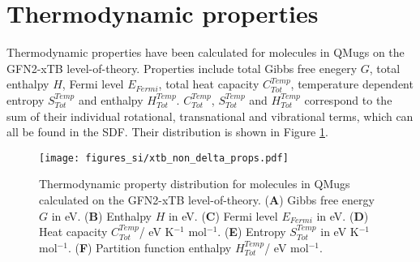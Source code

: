 \newpage
\section{Thermodynamic properties}
Thermodynamic properties have been calculated for molecules in QMugs on the GFN2-xTB level-of-theory. Properties include total Gibbs free enegery $G$, total enthalpy $H$,  Fermi level $E_{Fermi}$, total heat capacity $C_{Tot}^{Temp}$, temperature dependent entropy $S_{Tot}^{Temp}$ and enthalpy $H_{Tot}^{Temp}$. $C_{Tot}^{Temp}$, $S_{Tot}^{Temp}$ and $H_{Tot}^{Temp}$ correspond to the sum of their individual rotational, transnational and vibrational terms, which can all be found in the SDF. Their distribution is shown in Figure \ref{fig:theromo}. 

\begin{figure}[H]
\centering
\texttt{[image: figures\_si/xtb\_non\_delta\_props.pdf]}
\caption{Thermodynamic property distribution for molecules in QMugs calculated on the GFN2-xTB level-of-theory. (\textbf{A}) Gibbs free energy $G$ in eV. (\textbf{B}) Enthalpy $H$ in eV. (\textbf{C}) Fermi level $E_{Fermi}$ in eV. (\textbf{D}) Heat capacity $C_{Tot}^{Temp}$/ eV K$^{-1}$ mol$^{-1}$.  (\textbf{E}) Entropy $S_{Tot}^{Temp}$ in eV K$^{-1}$ mol$^{-1}$. (\textbf{F}) Partition function enthalpy $H_{Tot}^{Temp}$/ eV mol$^{-1}$.
}
\label{fig:theromo}
\end{figure}